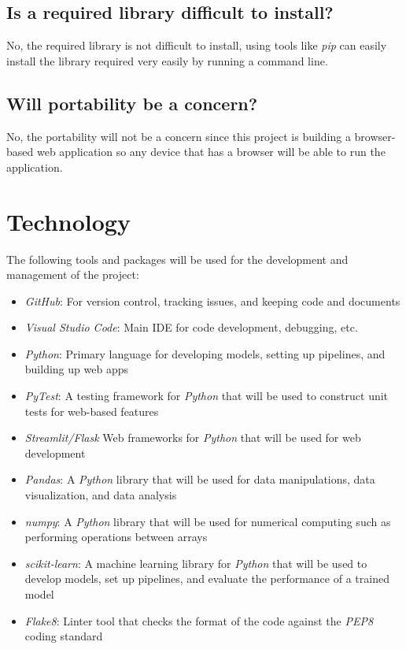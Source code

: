 \documentclass{article}
\begin{document}
    \subsection*{Is a required library difficult to install?}
    No, the required library is not difficult to install, using tools like \textit{pip} can easily install the library required very easily by running a command line.
    \subsection*{Will portability be a concern?}
    No, the portability will not be a concern since this project is building a browser-based web application so any device that has a browser will be able to run the application.
\section{Technology}
The following tools and packages will be used for the development and management of the project: 
\begin{itemize}
    \item \textit{GitHub}: For version control, tracking issues, and keeping code and documents
    \item \textit{Visual Studio Code}: Main IDE for code development, debugging,  etc.
    \item \textit{Python}: Primary language for developing models, setting up pipelines, and building up web apps
    \item \textit{PyTest}: A testing framework for \textit{Python} that will be used to construct unit tests for web-based features
    \item \textit{Streamlit/Flask} Web frameworks for \textit{Python} that will be used for web development
    \item \textit{Pandas}: A \textit{Python} library that will be used for data manipulations, data visualization, and data analysis
    \item \textit{numpy}: A \textit{Python} library that will be used for numerical computing such as performing operations between arrays
    \item \textit{scikit-learn}: A machine learning library for \textit{Python} that will be used to develop models, set up pipelines, and evaluate the performance of a trained model
    \item \textit{Flake8}: Linter tool that checks the format of the code against the \textit{PEP8} coding standard
\end{itemize}
\end{document}
